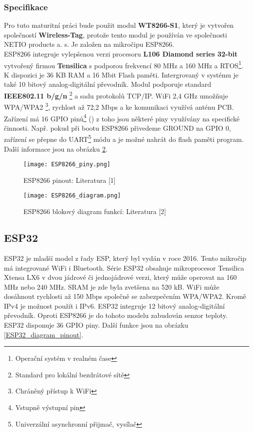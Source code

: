 \documentclass[a4paper, 12pt]{report}
\begin{document}
				\subsubsection{Specifikace}
					Pro tuto maturitní práci bude použit modul \textbf{WT8266-S1}, který je vytvořen společností \textbf{Wireless-Tag}, protože tento modul je používán ve společnosti NETIO products a. s. Je založen na mikročipu ESP8266.\\
					ESP8266 integruje vylepšenou verzi procesoru \textbf{L106 Diamond series 32-bit} vytvořený firmou \textbf{Tensilica} s podporou frekvencí 80 \si{MHz} a 160 \si{MHz} a RTOS\footnote{Operační systém v realném čase}.
					K dispozici je 36 \si{KB} RAM a 16 \si{Mbit} Flash paměti. Intergrovaný v systému je také 10 bitový analog-digitální převodník. Modul podporuje standard {\bf IEEE802.11 b/g/n}	\footnote{Standard pro lokální bezdrátové sítě} a sadu protokolů TCP/IP. WiFi 2,4 \si{GHz} umožňuje WPA/WPA2 \footnote{Chráněný přístup k WiFi}, rychlost až 72,2 \si{Mbps} a ke komunikaci využívá anténu PCB. Zařízení má 16 GPIO pinů\footnote{Vstupně výstupní pin} () z toho jsou některé piny využívány na specifické činnosti. Např. pokud při bootu ESP8266 přivedeme GROUND na GPIO 0, zařízení se přepne do UART\footnote{Univerzální asynchronní přijmač, vysílač} módu a je možné nahrát do flash paměti program. Další informace jsou na obrázku \ref{ESP8266_diagram}.

					\begin{figure}[h]
						\centering
						\texttt{[image: ESP8266\_piny.png]}
						\caption{ESP8266 pinout: Literatura [1]}
						\label{ESP8266_piny}
					\end{figure}
					\begin{figure}[h]
						\centering
						\texttt{[image: ESP8266\_diagram.png]}
						\caption{ESP8266 blokový diagram funkcí: Literatura [2]}
						\label{ESP8266_diagram}
					\end{figure}

			\subsection{ESP32}
				ESP32 je mladší model z řady ESP, který byl vydán v roce 2016. Tento mikročip má integrované WiFi i Bluetooth. Série ESP32 obsahuje mikroprocesor Tensilica Xtensa LX6 v dvou jádrové či jednojádrové verzi, který může operovat na 160 \si{MHz} nebo 240 \si{MHz}. SRAM je zde byla zvetšena na 520 \si{kB}. WiFi může dosáhnout rychlosti až 150 \si{Mbps} společně se zabezpečením WPA/WPA2. Kromě IPv4 je možnost použít i IPv6. ESP32 integruje 12 bitový analog-digitální převodník. Oproti ESP8266 je do tohoto modelu zabudován senzor teploty. ESP32 disponuje 36 GPIO piny. Další funkce jsou na obrázku \ref{ESP32_diagram_pinout}. \\
\end{document}
